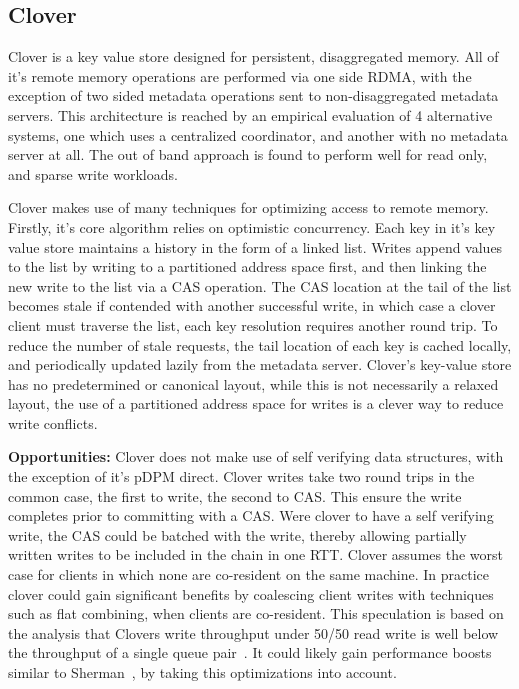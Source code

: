 \subsection{Clover}

Clover is a key value store designed for persistent, disaggregated memory. All
of it's remote memory operations are performed via one side RDMA, with the
exception of two sided metadata operations sent to non-disaggregated metadata
servers. This architecture is reached by an empirical evaluation of 4
alternative systems, one which uses a centralized coordinator, and another with
no metadata server at all. The out of band approach is found to perform well for
read only, and sparse write workloads. 

Clover makes use of many techniques for optimizing access to remote memory.
Firstly, it's core algorithm relies on optimistic concurrency. Each key in it's
key value store maintains a history in the form of a linked list. Writes append
values to the list by writing to a partitioned address space first, and then
linking the new write to the list via a CAS operation. The CAS location at the
tail of the list becomes stale if contended with another successful write, in
which case a clover client must traverse the list, each key resolution requires
another round trip. To reduce the number of stale requests, the tail location of
each key is cached locally, and periodically updated lazily from the metadata
server. Clover's key-value store has no predetermined or canonical layout, while
this is not necessarily a relaxed layout, the use of a partitioned address space
for writes is a clever way to reduce write conflicts.


\textbf{Opportunities:} Clover does not make use of self verifying data
structures, with the exception of it's pDPM direct. Clover writes take two round
trips in the common case, the first to write, the second to CAS. This ensure the
write completes prior to committing with a CAS. Were clover to have a self
verifying write, the CAS could be batched with the write, thereby allowing
partially written writes to be included in the chain in one RTT. Clover assumes
the worst case for clients in which none are co-resident on the same machine. In
practice clover could gain significant benefits by coalescing client writes with
techniques such as flat combining, when clients are co-resident. This
speculation is based on the analysis that Clovers write throughput under 50/50
read write is well below the throughput of a single queue
pair~\cite{design-guidelines}. It could likely gain performance boosts similar
to Sherman~\cite{sherman}, by taking this optimizations into account. 

